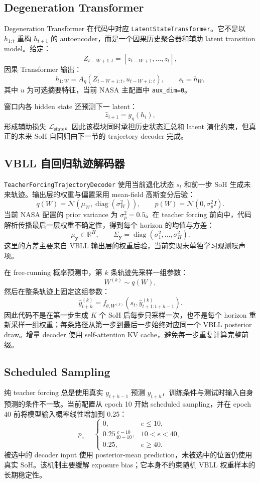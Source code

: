 \documentclass[11pt,a4paper,fontset=none]{ctexart}
\begin{document}
\subsection{Degeneration Transformer}

Degeneration Transformer 在代码中对应 \texttt{LatentStateTransformer}。它不是以 $h_{1:t}$ 重构 $h_{t+1}$ 的 autoencoder，而是一个因果历史聚合器和辅助 latent transition model。给定：
\[
Z_{t-W+1:t}=[z_{t-W+1},\ldots,z_t],
\]
因果 Transformer 输出：
\[
h_{1:W}=A_\eta(Z_{t-W+1:t},u_{t-W+1:t}),
\qquad s_t=h_W,
\]
其中 $u$ 为可选摘要特征，当前 NASA 主配置中 \texttt{aux\_dim=0}。

窗口内各 hidden state 还预测下一 latent：
\[
\hat z_{i+1}=g_\eta(h_i),
\]
形成辅助损失 $\mathcal L_{\mathrm{state}}$。因此该模块同时承担历史状态汇总和 latent 演化约束，但真正的未来 SoH 自回归由下一节的 trajectory decoder 完成。

\subsection{VBLL 自回归轨迹解码器}

\texttt{TeacherForcingTrajectoryDecoder} 使用当前退化状态 $s_t$ 和前一步 SoH 生成未来轨迹。输出层的权重与偏置采用 mean-field 高斯变分后验：
\[
q(W)=\mathcal N(\mu_W,\operatorname{diag}(\sigma_W^2)),
\qquad
p(W)=\mathcal N(0,\sigma_p^2 I).
\]
当前 NASA 配置的 prior variance 为 $\sigma_p^2=0.5$。在 teacher forcing 前向中，代码解析传播最后一层权重不确定性，得到每个 horizon 的均值与方差：
\[
\mu_{\mathbf y}\in\mathbb R^H,\qquad
\Sigma_{\mathbf y}=\operatorname{diag}(\sigma_1^2,\ldots,\sigma_H^2).
\]
这里的方差主要来自 VBLL 输出层的权重后验，当前实现未单独学习观测噪声项。

在 free-running 概率预测中，第 $k$ 条轨迹先采样一组参数：
\[
W^{(k)}\sim q(W),
\]
然后在整条轨迹上固定这组参数：
\[
\hat y_{t+h}^{(k)}
=
f_{\theta,W^{(k)}}\!
\left(s_t,\hat y_{t+1:t+h-1}^{(k)}\right).
\]
因此代码不是在第一步生成 $K$ 个 SoH 后每步只采样一次，也不是每个 horizon 重新采样一组权重；每条路径从第一步到最后一步始终对应同一个 VBLL posterior draw。增量 decoder 使用 self-attention KV cache，避免每一步重复计算完整前缀。

\subsection{Scheduled Sampling}

纯 teacher forcing 总是使用真实 $y_{t+h-1}$ 预测 $y_{t+h}$，训练条件与测试时输入自身预测的条件不一致。当前配置从 epoch 10 开始 scheduled sampling，并在 epoch 40 前将模型输入概率线性增加到 0.25：
\[
p_e=
\begin{cases}
0, & e\leq 10,\\
0.25\frac{e-10}{40-10}, & 10<e<40,\\
0.25, & e\geq 40.
\end{cases}
\]
被选中的 decoder input 使用 posterior-mean prediction，未被选中的位置仍使用真实 SoH。该机制主要缓解 exposure bias；它本身不约束随机 VBLL 权重样本的长期稳定性。
\end{document}
